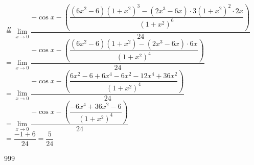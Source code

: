 \documentclass[a4paper]{article}
\newcommand{\limit}{\lim\limits}
\begin{document}
$\overset{H}{=}\limit_{x \rightarrow 0} \dfrac{-\cos x - \left(\dfrac{(6x^2 - 6)(1+x^2)^3 - (2x^3 - 6x) \cdot 3(1+x^2)^2 \cdot 2x}{(1+x^2)^6}\right)}{24} $ \\

$= \limit_{x \rightarrow 0} \dfrac{-\cos x - \left(\dfrac{(6x^2 - 6)(1+x^2) - (2x^3 - 6x) \cdot 6x}{(1+x^2)^4}\right)}{24} $ \\

$= \limit_{x \rightarrow 0} \dfrac{-\cos x - \left(\dfrac{6x^2 - 6 + 6x^4 - 6x^2 - 12x^4 + 36x^2}{(1+x^2)^4}\right)}{24} $ \\

$= \limit_{x \rightarrow 0} \dfrac{-\cos x - \left(\dfrac{-6x^4 + 36x^2 - 6}{(1+x^2)^4}\right)}{24} $ \\

$= \dfrac{- 1 + 6}{24} = \dfrac{5}{24} $ \\

\begin{thebibliography}{999}
\end{thebibliography}
\end{document}
